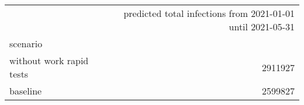 \begin{tabular}{lr}
\toprule
{} &  predicted total infections from 2021-01-01 until 2021-05-31 \\
scenario                  &                                                              \\
\midrule
 without work rapid tests &                                            2911927 \\
 baseline                 &                                            2599827 \\
\bottomrule
\end{tabular}
